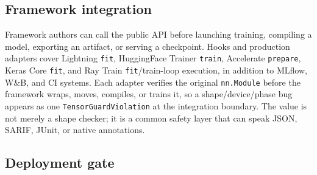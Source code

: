 \documentclass[11pt]{article}
\begin{document}
\subsection{Framework integration}

Framework authors can call the public API before launching training, compiling
a model, exporting an artifact, or serving a checkpoint.  Hooks and production
adapters cover Lightning \texttt{fit}, HuggingFace Trainer \texttt{train},
Accelerate \texttt{prepare}, Keras Core \texttt{fit}, and Ray Train
\texttt{fit}/train-loop execution, in addition to MLflow, W\&B, and CI systems.
Each adapter verifies the original \texttt{nn.Module} before the framework wraps,
moves, compiles, or trains it, so a shape/device/phase bug appears as one
\texttt{TensorGuardViolation} at the integration boundary.  The value is not
merely a shape checker; it is a common safety layer that can speak JSON, SARIF,
JUnit, or native annotations.

\subsection{Deployment gate}
\end{document}
